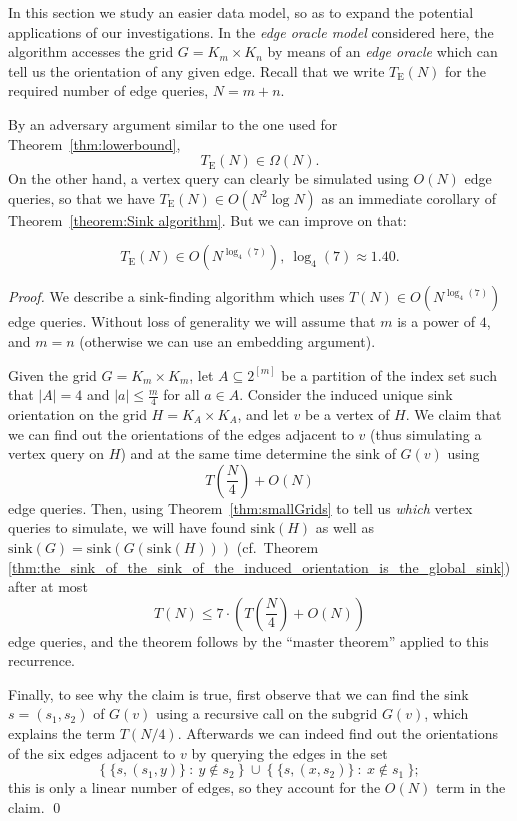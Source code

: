 \documentclass[runningheads,a4paper]{llncs}
\newcommand{\timeEdge}{\ensuremath{T_\mathrm{E}}}
\newcommand{\sink}{\ensuremath{\mathrm{sink}}}
\begin{document}
In this section we study an easier data model, so as to expand the potential
applications of our investigations.
In the \emph{edge oracle model} considered here, the algorithm accesses the
grid $G = K_m \times K_n$ by means of an \emph{edge oracle} which can tell us
the orientation of any given edge.
Recall that we write $\timeEdge(N)$ for the required number of edge queries,
$N = m+n$.

By an adversary argument similar to the one used for Theorem~\ref{thm:lowerbound},
\[
    \timeEdge(N) \in \Omega(N).
\]
On the other hand, a vertex query can clearly be simulated using $O(N)$ edge
queries, so that we have $\timeEdge(N) \in O(N^2 \log N)$ as an immediate
corollary of Theorem~\ref{theorem:Sink algorithm}.
But we can improve on that:

\begin{theorem}
    \label{thm:timeEdge}
    \[
        \timeEdge(N) \in O(N ^ {\log_4(7)}),~ \log_4(7) \approx 1.40.
    \]
\end{theorem}

\begin{proof}
    We describe a sink-finding algorithm which uses
    $T(N) \in O(N ^ {\log_4(7)})$ edge queries.
    Without loss of generality we will assume that $m$ is a power of $4$, and
    $m=n$ (otherwise we can use an embedding argument).

    Given the grid $G = K_m \times K_m$, let $A \subseteq 2 ^ {[m]}$
    be a partition of the index set such that
    $|A| = 4$ and $|a| \le \frac{m}{4}$ for all $a \in A$.
    Consider the induced unique sink orientation on the grid
    $H = K_A \times K_A$, and let $v$ be a vertex of $H$.
    We claim that we can find out the orientations of the edges adjacent to
    $v$ (thus simulating a vertex query on $H$)
    and at the same time determine the sink of $G(v)$ using
    \[
        T \left( \frac{N}{4} \right) + O(N)
    \]
    edge queries.
    Then, using Theorem~\ref{thm:smallGrids} to tell us \emph{which} vertex
    queries to simulate, we will have found $\sink(H)$ as well as
    $\sink(G) = \sink(G(\sink(H)))$ (cf.~Theorem
    \ref{thm:the_sink_of_the_sink_of_the_induced_orientation_is_the_global_sink})
    after at most
    \[
        T(N) \le 7 \cdot \left( T \left( \frac{N}{4} \right) + O(N) \right)
    \]
    edge queries, and the theorem follows by the ``master theorem'' applied to
    this recurrence.

    Finally, to see why the claim is true, first observe that we can find the
    sink $s = (s_1,s_2)$ of $G(v)$ using a recursive call on the subgrid
    $G(v)$, which explains the term $T(N/4)$.
    Afterwards we can indeed find out the orientations of the six edges
    adjacent to $v$ by querying the edges in the set
    \[
        \bigl\{~ \{ s,(s_1,y) \} ~:~ y \notin s_2 ~\bigr\}
        ~\cup~
        \bigl\{~ \{ s,(x,s_2) \} ~:~ x \notin s_1 ~\bigr\};
    \]
    this is only a linear number of edges, so they account for the $O(N)$
    term in the claim. \qed
\end{proof}
\end{document}
